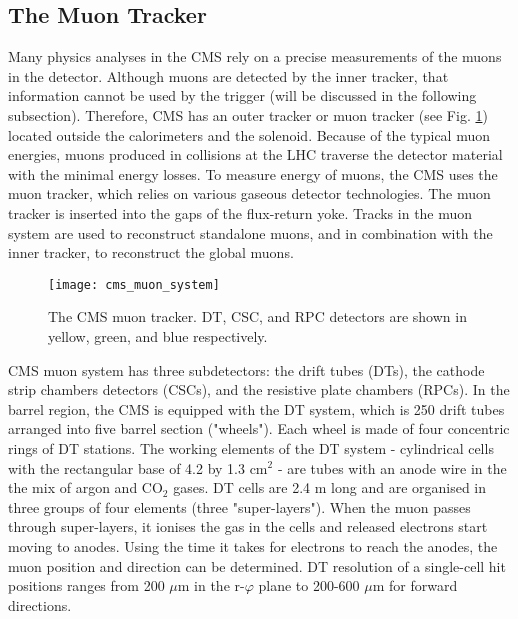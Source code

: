 \begin{normalsize}

\subsection{The Muon Tracker}

Many physics analyses in the CMS rely on a precise measurements of the muons in the detector. Although muons are detected by the inner tracker, that information cannot be used by the trigger (will be discussed in the following subsection). Therefore, CMS has an outer tracker or muon tracker \cite{Muon_system_TDR} (see Fig. \ref{cms_muon_system}) located outside the calorimeters and the solenoid. Because of the typical muon energies, muons produced in collisions at the LHC traverse the detector material with the minimal energy losses. To measure energy of muons, the CMS uses the muon tracker, which relies on various gaseous detector technologies. The muon tracker is inserted into the gaps of the flux-return yoke. Tracks in the muon system are used to reconstruct standalone muons, and in combination with the inner tracker, to reconstruct the global muons.

 \begin{figure}[H]
  \centering
  \texttt{[image: cms\_muon\_system]}
  \caption[The CMS muon tracker]{The CMS muon tracker. DT, CSC, and RPC detectors are shown in yellow, green, and blue respectively.}
  \label{cms_muon_system}
\end{figure}

CMS muon system has three subdetectors: the drift tubes (DTs), the cathode strip chambers detectors (CSCs), and the resistive plate chambers (RPCs). In the barrel region, the CMS is equipped with the DT system, which is 250 drift tubes  arranged into five barrel section ("wheels"). Each wheel is made of four concentric rings of DT stations. The working elements of the DT system - cylindrical cells with the rectangular base of 4.2 by 1.3 cm$^2$ - are tubes with an anode wire in the the mix of argon and CO$_2$ gases. DT cells are 2.4 m long and are organised in three groups of four elements (three "super-layers"). When the muon passes through super-layers, it ionises the gas in the cells and released electrons start moving to anodes. Using the time it takes for electrons to reach the anodes, the muon position and direction can be determined. DT resolution of a single-cell hit positions ranges from 200 $\mu$m in the r-$\varphi$ plane to 200-600 $\mu$m for forward directions. 


\end{normalsize}
